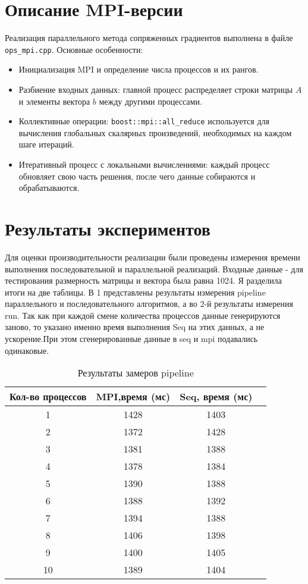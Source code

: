 \documentclass[12pt]{article}
\begin{document}
\section{Описание MPI-версии}
Реализация параллельного метода сопряженных градиентов выполнена в файле \texttt{ops\_mpi.cpp}. Основные особенности:
\begin{itemize}
    \item Инициализация MPI и определение числа процессов и их рангов.
    \item Разбиение входных данных: главной процесс распределяет строки матрицы $A$ и элементы вектора $b$ между другими процессами.
    \item Коллективные операции: \texttt{boost::mpi::all\_reduce} используется для вычисления глобальных скалярных произведений, необходимых на каждом шаге итераций.
    \item Итеративный процесс с локальными вычислениями: каждый процесс обновляет свою часть решения, после чего данные собираются и обрабатываются.
\end{itemize}


\section{Результаты экспериментов}
Для оценки производительности реализации были проведены измерения времени выполнения последовательной и параллельной реализаций. Входные данные - для тестирования размерность матрицы и вектора была равна 1024.
Я разделила итоги на две таблицы. В 1 представлены результаты измерения pipeline параллельного и последовательного алгоритмов, а во 2-й результаты измерения run. Так как при каждой смене количества процессов данные генерируются заново, то указано именно время выполнения Seq на этих данных, а не ускорение.При этом сгенерированные данные в seq и mpi подавались одинаковые. 
\begin{table}[htbp]
\centering
\caption{Результаты замеров pipeline}
\begin{tabular}{|c|c|c|c|}
    \hline
    \textbf{Кол-во процессов} & \textbf{MPI,время (мс)} & \textbf{Seq, время (мс)} \\ \hline
    1 & 1428 & 1403 \\ \hline
    2 & 1372 & 1428 \\ \hline
    3 & 1381 & 1388 \\ \hline
    4 & 1378  & 1384 \\ \hline
    5 & 1390  & 1388 \\ \hline
    6 & 1388  & 1392 \\ \hline
    7 & 1394  & 1388 \\ \hline
    8 & 1406  & 1398 \\ \hline
    9 & 1400  & 1405 \\ \hline
    10 & 1389  & 1404 \\ \hline
\end{tabular}
\label{tab:performance_results_pipeline}
\end{table}
\end{document}
